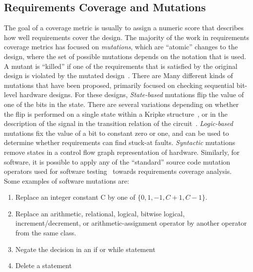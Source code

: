 


\subsection{Requirements Coverage and Mutations}
The goal of a coverage metric is usually to assign a numeric score that describes how well requirements cover the design.  The majority of the work in requirements coverage metrics has focused on {\em mutations}, which are ``atomic'' changes to the design, where the set of possible mutations depends on the notation that is used.  A mutant is ``killed'' if one of the requirements that is satisfied by the original design is violated by the mutated design~\cite{chockler_coverage_2003,chockler2001practical,chockler2010coverage,Kupferman:2006:SCF,kupferman_theory_2008}.  There are Many different kinds of mutations that have been proposed, primarily focused on checking sequential bit-level hardware designs.  For these designs, {\em State-based} mutations flip the value of one of the bits in the state.  There are several variations depending on whether the flip is performed on a single state within a Kripke structure~\cite{hoskote1999coverage}, or in the description of the signal in the transition relation of the circuit~\cite{chockler2001practical}.  {\em Logic-based} mutations fix the value of a bit to constant zero or one, and can be used to determine whether requirements can find stuck-at faults.  {\em Syntactic} mutations~\cite{chockler_coverage_2003} remove states in a control flow graph representation of hardware.  Similarly, for software, it is possible to apply any of the ``standard'' source code mutation operators used for software testing~\cite{Andrews06:mutation} towards requirements coverage analysis.  Some examples of software mutations are: 
\begin{enumerate}
    \item Replace an integer constant C by one of $\{0, 1, -1, C + 1, C - 1\}$.
    \item Replace an arithmetic, relational, logical, bitwise logical, increment/decrement, or arithmetic-assignment operator by another operator from the same class.
    \item Negate the decision in an if or while statement
    \item Delete a statement
\end{enumerate}


